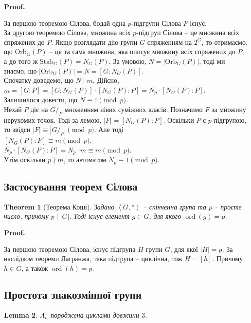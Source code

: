 \documentclass[a4paper, 10pt]{article}
\makeatletter
\theoremstyle{theoremdd}
\newtheorem{theorem}{Theorem}[subsection]
\theoremstyle{theoremdd}
\theoremstyle{theoremdd}
\theoremstyle{theoremdd}
\theoremstyle{theoremdd}
\theoremstyle{theoremdd}
\theoremstyle{theoremdd}
\theoremstyle{theoremdd}
\theoremstyle{theoremdd}
\theoremstyle{theoremdd}
\theoremstyle{theoremdd}
\theoremstyle{theoremdd}
\theoremstyle{theoremdd}
\newtheorem{lemma}[theorem]{Lemma}
\theoremstyle{theoremdd}
\theoremstyle{theoremdd}
\renewenvironment{proof}[1][Proof.\\]{\par
\pushQED{\hfill \qed}%
\normalfont \topsep6\p@\@plus6\p@\relax
\trivlist
\item\relax
{\bfseries
#1\@addpunct{.}}\hspace\labelsep\ignorespaces
}{%
\popQED\endtrivlist\@endpefalse
}
\DeclareMathOperator{\ord}{ord}
\newcommand\Orb{\text{Orb}}
\newcommand\Stab{\text{Stab}}
\makeatother
\begin{document}
\begin{proof}
За першою теоремою Сілова, бодай одна $p$-підгрупи Сілова $P$ існує. \\
За другою теоремою Сілова, множина всіх $p$-підгруп Сілова -- це множина всіх спряжених до $P$. Якщо розглядати дію групи $G$ спряженням на $2^G$, то отримаємо, що $\Orb_G(P)$ -- це та сама множина, яка описує множину всіх спряжених до $P$, а до того ж $\Stab_G(P) = N_G(P)$. За умовою, $N = |\Orb_G(P)|$, тоді ми знаємо, що $|\Orb_G(P)| = N = [G: N_G(P)]$.\\
Спочатку доведемо, що $N \mid m$. Дійсно,\\
$m = [G:P] = [G:N_G(P)] \cdot [N_G(P) : P] = N_p \cdot [N_G(P) : P]$.\\
Залишилося довести, що $N \equiv 1 \pmod p$.\\
Нехай $P$ діє на $G/_P$ множенням лівих суміжних класів. Позначимо $F$ за множину нерухомих точок. Тоді за лемою, $|F| = [N_G(P) : P]$. Оскільки $P$ є $p$-підгрупою, то звідси $|F| \equiv |G/_P| \pmod p$. Але тоді\\
$[N_G(P) : P] \equiv m \pmod p$.\\
$N_p \cdot [N_G(P):P] = N_p \cdot m \equiv m \pmod p$.\\
Утім оскільки $p \nmid m$, то автоматом $N_p \equiv 1 \pmod p$.
\end{proof}

\subsection{Застосування теорем Сілова}
\begin{theorem}[Теорема Коші]
Задано $\left< G, *\right>$ -- скінченна група та $p$ -- просте число, причому $p \mid |G|$. Тоді існує елемент $g \in G$, для якого $\ord(g) = p$.
\end{theorem}

\begin{proof}
За першою теоремою Сілова, існує підгрупа $H$ групи $G$, для якої $|H| = p$. За наслідком теореми Лагранжа, така підгрупа -- циклічна, тож $H = [h]$. Причому $h \in G$, а також $\ord(h) = p$.
\end{proof}

\subsection{Простота знакозмінної групи}
\begin{lemma}
$A_n$ породжена циклами довжини $3$.
\end{lemma}
\end{document}

